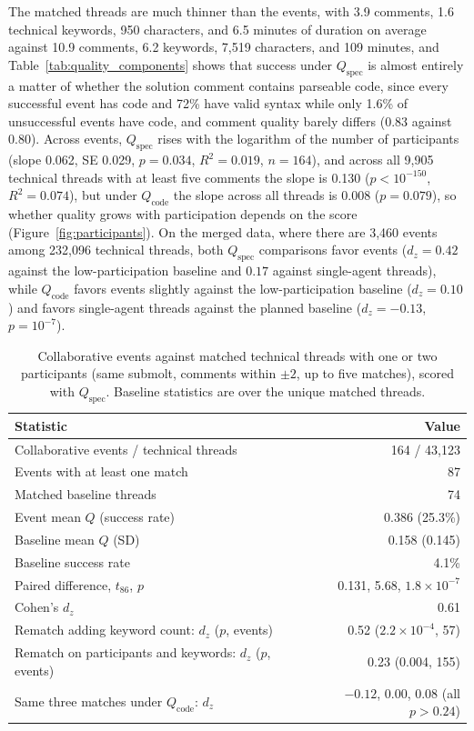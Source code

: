 \documentclass{article}
\begin{document}
The matched threads are much thinner than the events, with 3.9 comments, 1.6 technical keywords, 950 characters, and 6.5 minutes of duration on average against 10.9 comments, 6.2 keywords, 7,519 characters, and 109 minutes, and Table~\ref{tab:quality_components} shows that success under $Q_{\text{spec}}$ is almost entirely a matter of whether the solution comment contains parseable code, since every successful event has code and 72\% have valid syntax while only 1.6\% of unsuccessful events have code, and comment quality barely differs (0.83 against 0.80). Across events, $Q_{\text{spec}}$ rises with the logarithm of the number of participants (slope 0.062, SE 0.029, $p = 0.034$, $R^2 = 0.019$, $n = 164$), and across all 9,905 technical threads with at least five comments the slope is 0.130 ($p < 10^{-150}$, $R^2 = 0.074$), but under $Q_{\text{code}}$ the slope across all threads is 0.008 ($p = 0.079$), so whether quality grows with participation depends on the score (Figure~\ref{fig:participants}). On the merged data, where there are 3,460 events among 232,096 technical threads, both $Q_{\text{spec}}$ comparisons favor events ($d_z = 0.42$ against the low-participation baseline and $0.17$ against single-agent threads), while $Q_{\text{code}}$ favors events slightly against the low-participation baseline ($d_z = 0.10$) and favors single-agent threads against the planned baseline ($d_z = -0.13$, $p = 10^{-7}$).

\begin{table}[H]
\centering
\caption{Collaborative events against matched technical threads with one or two participants (same submolt, comments within $\pm 2$, up to five matches), scored with $Q_{\text{spec}}$. Baseline statistics are over the unique matched threads.}
\label{tab:baseline_comparison}
\begin{tabular}{@{}lr@{}}
\toprule
\textbf{Statistic} & \textbf{Value} \\
\midrule
Collaborative events / technical threads & 164 / 43,123 \\
Events with at least one match & 87 \\
Matched baseline threads & 74 \\
Event mean $Q$ (success rate) & 0.386 (25.3\%) \\
Baseline mean $Q$ (SD) & 0.158 (0.145) \\
Baseline success rate & 4.1\% \\
Paired difference, $t_{86}$, $p$ & 0.131, 5.68, $1.8 \times 10^{-7}$ \\
Cohen's $d_z$ & 0.61 \\
\midrule
Rematch adding keyword count: $d_z$ ($p$, events) & 0.52 ($2.2 \times 10^{-4}$, 57) \\
Rematch on participants and keywords: $d_z$ ($p$, events) & 0.23 (0.004, 155) \\
Same three matches under $Q_{\text{code}}$: $d_z$ & $-0.12$, 0.00, 0.08 (all $p > 0.24$) \\
\bottomrule
\end{tabular}
\end{table}
\end{document}
